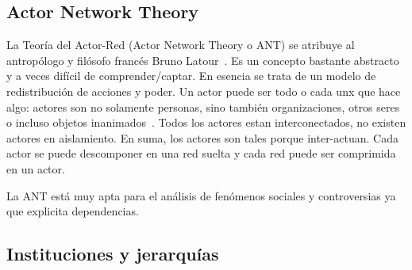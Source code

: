 \subsection{Actor Network Theory}

La Teoría del Actor-Red (Actor Network Theory o ANT) se atribuye al antropólogo y filósofo francés Bruno Latour~\autocite{Latour2010}.
Es un concepto bastante abstracto y a veces difícil de comprender/captar.
En esencia se trata de un modelo de redistribución de acciones y poder.
Un actor puede ser todo o cada unx que hace algo: actores son no solamente personas, sino también organizaciones, otros seres o incluso objetos inanimados~\autocite{Venturini2010b}.
Todos los actores estan interconectados, no existen actores en aislamiento.
En suma, los actores son tales porque inter-actuan.
Cada actor se puede descomponer en una red suelta y cada red puede ser comprimida en un actor.

La ANT está muy apta para el análisis de fenómenos sociales y controversias ya que explicita dependencias.


\subsection{Instituciones y jerarquías}

